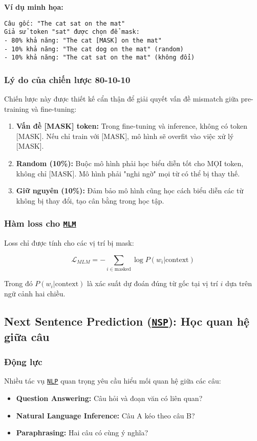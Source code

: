 \textbf{Ví dụ minh họa:}
\begin{verbatim}
Câu gốc: "The cat sat on the mat"
Giả sử token "sat" được chọn để mask:
- 80% khả năng: "The cat [MASK] on the mat"
- 10% khả năng: "The cat dog on the mat" (random)
- 10% khả năng: "The cat sat on the mat" (không đổi)
\end{verbatim}

\subsubsection{Lý do của chiến lược 80-10-10}
Chiến lược này được thiết kế cẩn thận để giải quyết vấn đề mismatch giữa pre-training và fine-tuning:

\begin{enumerate}
    \item \textbf{Vấn đề [MASK] token:} Trong fine-tuning và inference, không có token [MASK]. Nếu chỉ train với [MASK], mô hình sẽ overfit vào việc xử lý [MASK].
    
    \item \textbf{Random (10\%):} Buộc mô hình phải học biểu diễn tốt cho MỌI token, không chỉ [MASK]. Mô hình phải "nghi ngờ" mọi từ có thể bị thay thế.
    
    \item \textbf{Giữ nguyên (10\%):} Đảm bảo mô hình cũng học cách biểu diễn các từ không bị thay đổi, tạo cân bằng trong học tập.
\end{enumerate}

\subsubsection{Hàm loss cho \hyperref[acro:mlm]{\texttt{MLM}}}
Loss chỉ được tính cho các vị trí bị mask:

\begin{equation}
\mathcal{L}_{MLM} = -\sum_{i \in \text{masked}} \log P(w_i | \text{context})
\label{eq:mlm_loss}
\end{equation}

Trong đó $P(w_i | \text{context})$ là xác suất dự đoán đúng từ gốc tại vị trí $i$ dựa trên ngữ cảnh hai chiều.

\subsection{Next Sentence Prediction (\hyperref[acro:nsp]{\texttt{NSP}}): Học quan hệ giữa câu}
\label{ssec:nsp}

\subsubsection{Động lực}
Nhiều tác vụ \hyperref[acro:nlp]{\texttt{NLP}} quan trọng yêu cầu hiểu mối quan hệ giữa các câu:
\begin{itemize}
    \item \textbf{Question Answering:} Câu hỏi và đoạn văn có liên quan?
    \item \textbf{Natural Language Inference:} Câu A kéo theo câu B?
    \item \textbf{Paraphrasing:} Hai câu có cùng ý nghĩa?
\end{itemize}

